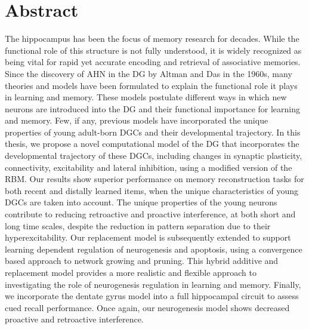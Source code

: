 \documentclass[
11pt, %
oneside, %
english, %
doublespacing
]{McMasterThesis} %
\begin{document}

\section*{Abstract} 
The hippocampus has been the focus of memory research for decades. 
While the functional role of this structure is not fully understood, it is widely
recognized as being vital for rapid yet accurate encoding and retrieval of associative
memories. 
Since the discovery of \ac{AHN} in the \ac{DG} 
by Altman and Das in the 1960s, many theories and models have been formulated 
to explain the functional role it plays in learning and memory. 
These models postulate different ways in which new neurons are introduced 
into the \ac{DG} and their functional importance for learning and memory.  
Few, if any, previous models have incorporated the unique properties of young 
adult-born \acp{DGC} and their developmental trajectory.
In this thesis, we propose a novel computational model of the \ac{DG} that 
incorporates the developmental trajectory of these \acp{DGC}, 
including changes in synaptic plasticity, connectivity, excitability and lateral inhibition, 
using a modified version of the \ac{RBM}. 
Our results show superior performance on memory reconstruction tasks for 
both recent and distally learned items, when the unique characteristics of young 
\ac{DGC}s are taken into account. 
The unique properties of the young neurons contribute to reducing retroactive and 
proactive interference, at both short and long time scales, despite the 
reduction in pattern separation due to their hyperexcitability. 
Our replacement model is subsequently extended to support learning dependent 
regulation of neurogenesis and apoptosis, 
using a convergence based approach to network growing and pruning.
This hybrid additive and replacement model provides 
a more realistic and flexible approach to investigating the role of 
neurogenesis regulation in learning and memory. 
Finally, we incorporate the dentate gyrus 
model into a full hippocampal circuit to assess cued recall performance. 
Once again, our neurogenesis model shows decreased 
proactive and retroactive interference.
\end{document}
